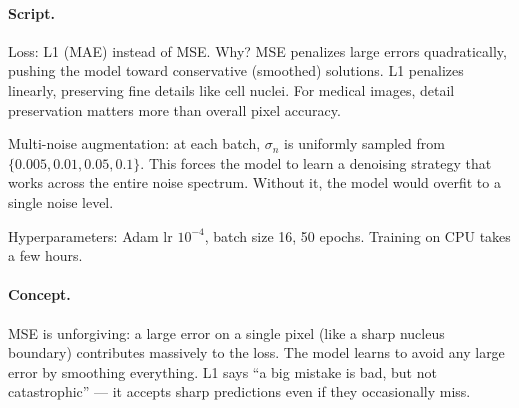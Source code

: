 \documentclass[english,11pt,a4paper]{article}
\begin{document}
\paragraph{Script.}
Loss: L1 (MAE) instead of MSE. Why? MSE penalizes large errors
quadratically, pushing the model toward conservative (smoothed)
solutions. L1 penalizes linearly, preserving fine details like
cell nuclei. For medical images, detail preservation matters more
than overall pixel accuracy.

Multi-noise augmentation: at each batch, $\sigma_n$ is uniformly
sampled from $\{0.005, 0.01, 0.05, 0.1\}$. This forces the model
to learn a denoising strategy that works across the entire noise
spectrum. Without it, the model would overfit to a single noise
level.

Hyperparameters: Adam lr $10^{-4}$, batch size 16, 50 epochs.
Training on CPU takes a few hours.

\paragraph{Concept.}
MSE is unforgiving: a large error on a single pixel (like a sharp
nucleus boundary) contributes massively to the loss. The model learns
to avoid any large error by smoothing everything. L1 says ``a big
mistake is bad, but not catastrophic'' --- it accepts sharp
predictions even if they occasionally miss.
\end{document}

